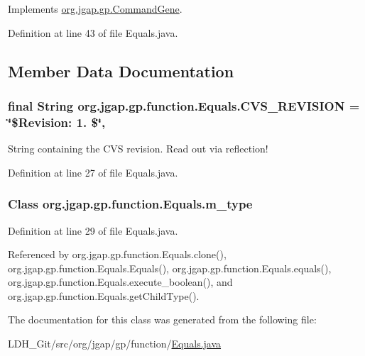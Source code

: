 Implements \hyperlink{classorg_1_1jgap_1_1gp_1_1_command_gene_a236141d99059da808afe7a9217e411c7}{org.\-jgap.\-gp.\-Command\-Gene}.



Definition at line 43 of file Equals.\-java.



\subsection{Member Data Documentation}
\hypertarget{classorg_1_1jgap_1_1gp_1_1function_1_1_equals_a6f5b4992bd3328361e584b2574e6faa1}{
\subsubsection[{C\-V\-S\-\_\-\-R\-E\-V\-I\-S\-I\-O\-N}]{\setlength{\rightskip}{0pt plus 5cm}final String org.\-jgap.\-gp.\-function.\-Equals.\-C\-V\-S\-\_\-\-R\-E\-V\-I\-S\-I\-O\-N = \char`\"{}\$Revision\-: 1. \$\char`\"{}\hspace{0.3cm}{\ttfamily [static]}, {\ttfamily [private]}}}\label{classorg_1_1jgap_1_1gp_1_1function_1_1_equals_a6f5b4992bd3328361e584b2574e6faa1}
String containing the C\-V\-S revision. Read out via reflection! 

Definition at line 27 of file Equals.\-java.

\hypertarget{classorg_1_1jgap_1_1gp_1_1function_1_1_equals_ad705940d646ddd7bdd330916933b7329}{
\subsubsection[{m\-\_\-type}]{\setlength{\rightskip}{0pt plus 5cm}Class org.\-jgap.\-gp.\-function.\-Equals.\-m\-\_\-type\hspace{0.3cm}{\ttfamily [private]}}}\label{classorg_1_1jgap_1_1gp_1_1function_1_1_equals_ad705940d646ddd7bdd330916933b7329}


Definition at line 29 of file Equals.\-java.



Referenced by org.\-jgap.\-gp.\-function.\-Equals.\-clone(), org.\-jgap.\-gp.\-function.\-Equals.\-Equals(), org.\-jgap.\-gp.\-function.\-Equals.\-equals(), org.\-jgap.\-gp.\-function.\-Equals.\-execute\-\_\-boolean(), and org.\-jgap.\-gp.\-function.\-Equals.\-get\-Child\-Type().



The documentation for this class was generated from the following file\-:\begin{DoxyCompactItemize}
\item 
L\-D\-H\-\_\-\-Git/src/org/jgap/gp/function/\hyperlink{_equals_8java}{Equals.\-java}\end{DoxyCompactItemize}

